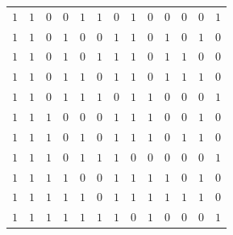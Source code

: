 \documentclass [15pt,a4paper,twoside]{article}
\begin{document}
\begin{center}
\begin{tabular}{cccccc|ccccccc}
$1$&$1$&$0$&$0$&$1$&$1$&$0$&$1$&$0$&$0$&$0$&$0$&$1$\\
$1$&$1$&$0$&$1$&$0$&$0$&$1$&$1$&$0$&$1$&$0$&$1$&$0$\\
$1$&$1$&$0$&$1$&$0$&$1$&$1$&$1$&$0$&$1$&$1$&$0$&$0$\\
$1$&$1$&$0$&$1$&$1$&$0$&$1$&$1$&$0$&$1$&$1$&$1$&$0$\\
$1$&$1$&$0$&$1$&$1$&$1$&$0$&$1$&$1$&$0$&$0$&$0$&$1$\\
$1$&$1$&$1$&$0$&$0$&$0$&$1$&$1$&$1$&$0$&$0$&$1$&$0$\\
$1$&$1$&$1$&$0$&$1$&$0$&$1$&$1$&$1$&$0$&$1$&$1$&$0$\\
$1$&$1$&$1$&$0$&$1$&$1$&$1$&$0$&$0$&$0$&$0$&$0$&$1$\\
$1$&$1$&$1$&$1$&$0$&$0$&$1$&$1$&$1$&$1$&$0$&$1$&$0$\\
$1$&$1$&$1$&$1$&$1$&$0$&$1$&$1$&$1$&$1$&$1$&$1$&$0$\\
$1$&$1$&$1$&$1$&$1$&$1$&$1$&$0$&$1$&$0$&$0$&$0$&$1$\\

\end{tabular}
\end{center}
\end{document}
